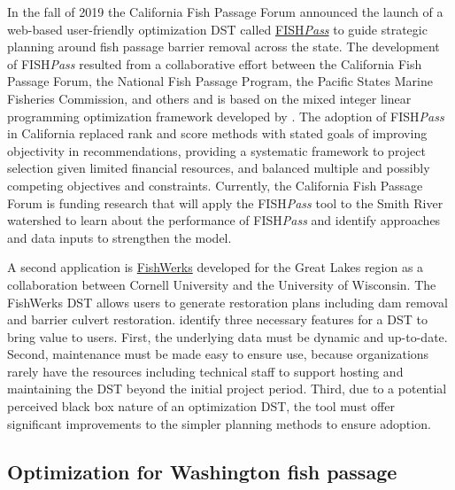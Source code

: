 \documentclass[12pt]{elsarticle}
\begin{document}
In the fall of 2019 the California Fish Passage Forum announced the launch of a web-based user-friendly optimization DST called \href{https://fishpass.psmfc.org}{FISH\emph{Pass}} to guide strategic planning around fish passage barrier removal across the state. The development of FISH\emph{Pass} resulted from a collaborative effort between the California Fish Passage Forum, the National Fish Passage Program, the Pacific States Marine Fisheries Commission, and others and is based on the mixed integer linear programming optimization framework developed by \citet{o2005optimizing}. The adoption of FISH\emph{Pass} in California replaced rank and score methods with stated goals of improving objectivity in recommendations, providing a systematic framework to project selection given limited financial resources, and balanced multiple and possibly competing objectives and constraints. Currently, the California Fish Passage Forum is funding research that will apply the FISH\emph{Pass} tool to the Smith River watershed to learn about the performance of FISH\emph{Pass} and identify approaches and data inputs to strengthen the model.


A second application is \href{https://greatlakesconnectivity.org}{FishWerks} developed for the Great Lakes region as a collaboration between Cornell University and the University of Wisconsin. The FishWerks DST allows users to generate restoration plans including dam removal and barrier culvert restoration. \citet{moody2017pet} identify three necessary features for a DST to bring value to users. First, the underlying data must be dynamic and up-to-date. Second, maintenance must be made easy to ensure use, because organizations rarely have the resources including technical staff to support hosting and maintaining the DST beyond the initial project period. Third, due to a potential perceived black box nature of an optimization DST, the tool must offer significant improvements to the simpler planning methods to ensure adoption.

\subsection{Optimization for Washington fish passage}
\end{document}
